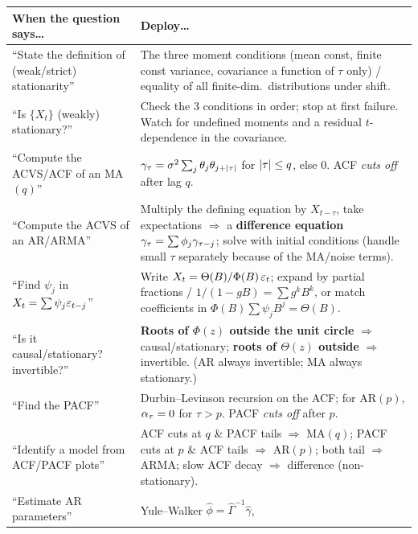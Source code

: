 \begin{tcolorbox}[enhanced,breakable,colback=orange!6!white,colframe=orange!75!black,
  arc=1.5mm,boxrule=0.7pt,title=\textbf{Cue $\rightarrow$ Tool: the decision table},
  coltitle=white,colbacktitle=orange!75!black,fonttitle=\bfseries]
\renewcommand{\arraystretch}{1.35}
\begin{tabular}{@{}p{}@{\hspace{0.5em}}p{}@{}}
\toprule
\textbf{When the question says\dots} & \textbf{Deploy\dots}\\
\midrule
``State the definition of (weak/strict) stationarity'' &
The three moment conditions (mean const, finite const variance, covariance a
function of $\tau$ only) / equality of all finite-dim.\ distributions under
shift.\\
``Is $\{X_t\}$ (weakly) stationary?'' &
Check the 3 conditions in order; stop at first failure. Watch for undefined
moments and a residual $t$-dependence in the covariance.\\
``Compute the ACVS/ACF of an MA$(q)$'' &
$\gamma_\tau=\sigma^2\sum_j\theta_j\theta_{j+\left\lvert \tau \right\rvert}$ for $\left\lvert \tau \right\rvert\le q$, else
$0$. ACF \emph{cuts off} after lag $q$.\\
``Compute the ACVS of an AR/ARMA'' &
Multiply the defining equation by $X_{t-\tau}$, take expectations $\Rightarrow$
a \textbf{difference equation} $\gamma_\tau=\sum\phi_j\gamma_{\tau-j}$; solve with
initial conditions (handle small $\tau$ separately because of the MA/noise
terms).\\
``Find $\psi_j$ in $X_t=\sum\psi_j\varepsilon_{t-j}$'' &
Write $X_t=\Theta(B)/\Phi(B)\,\varepsilon_t$; expand by partial fractions /
$1/(1-gB)=\sum g^kB^k$, or match coefficients in $\Phi(B)\sum\psi_jB^j=\Theta(B)$.\\
``Is it causal/stationary? invertible?'' &
\textbf{Roots of $\Phi(z)$ outside the unit circle} $\Rightarrow$
causal/stationary; \textbf{roots of $\Theta(z)$ outside} $\Rightarrow$
invertible. (AR always invertible; MA always stationary.)\\
``Find the PACF'' &
Durbin--Levinson recursion on the ACF; for AR$(p)$, $\alpha_\tau=0$ for
$\tau>p$. PACF \emph{cuts off} after $p$.\\
``Identify a model from ACF/PACF plots'' &
ACF cuts at $q$ \& PACF tails $\Rightarrow$ MA$(q)$; PACF cuts at $p$ \& ACF
tails $\Rightarrow$ AR$(p)$; both tail $\Rightarrow$ ARMA; slow ACF decay
$\Rightarrow$ difference (non-stationary).\\
``Estimate AR parameters'' &
Yule--Walker $\hat\phi=\hat\Gamma^{-1}\hat\gamma$,

\end{tabular}
\end{tcolorbox}
